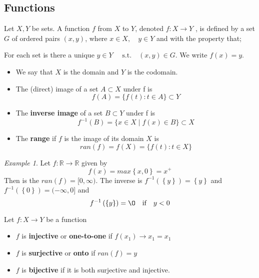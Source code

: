 \documentclass{article}
\theoremstyle{remark}
\newtheorem{example}{Example}
\begin{document}
\subsection{Functions}%
\label{sub:functions}

Let $X,Y$ be sets. A function $f$ from $X$ to $Y$, denoted $f: X \to Y$ , is defined by a set $G$ of ordered pairs $\left( x,y \right) $, where $x \in X, \quad  y \in Y  $ and with the property that;
\par
For each set is there a unique $y \in Y \quad  \text{ s.t.} \quad  \left( x,y \right) \in G $. We write $f\left( x \right) = y$. 
\begin{itemize}
  \item We say that $X$ is the domain and $Y$ is the codomain.
  \item The (direct) image of a set $ A \subset X$ under f is \[
  f\left( A \right) = \{f\left( t \right): t \in A\} \subset Y
  \] 
\item The \textbf{inverse image}  of a set $B \subset Y$ under f is \[
    f^{-1} \left(  B \right)  = \{x \in X  \mid f\left( x \right) \in B\} \subset X
\] 
\item The \textbf{range} if $f$ is the image of its domain $X$ is \[
    ran\left( f \right) = f\left( X \right) = \{f\left( t \right): t \in X\} 
\] 
\end{itemize}

\begin{example}
  Let $f: \mathbb{R}  \to \mathbb{R} $ given by \[
  f\left( x \right) = max\left\{ x,0 \right\} = x^{+}
  \] 
  Then is the $ran\left( f \right) = [0, \infty)$.  The inverse is $f^{-1} \left( \left\{ y \right\} \right) = \left\{ y \right\}$ and $f^{-1}\left( \left\{ 0 \right\} \right) = (- \infty , 0]$  and \[
  f^{-1} \left( \left\{ y \right\} \right) = \O \quad \text{if} \quad  y < 0  
  \] 
\end{example}


\begin{definition}
  Let $f: X \to Y$ be a function
  \begin{itemize}
    \item $f$ is \textbf{injective}  or \textbf{one-to-one}  if $f\left( x_{1} \right) \to x_{1} = x_{1}$ 
    \item $f$ is \textbf{surjective}  or \textbf{onto}  if $ran\left( f \right) = y$ 
    \item $f$ is \textbf{bijective}  if it is both surjective and injective.
  \end{itemize}
\end{definition}
\end{document}
